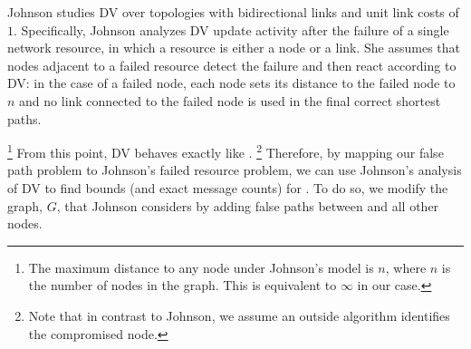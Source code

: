 {%
Johnson \cite{Johnson84} studies DV over topologies with bidirectional links and unit link costs of $1$.  Specifically, Johnson analyzes DV update 
activity after the failure of a single network resource, in which a resource is either a node or a link.  She assumes that nodes adjacent to a failed resource detect 
the failure and then react according to DV: in the case of a failed node, each node sets its distance to the failed node to $n$ and no link connected to the 
failed node is used in the final correct shortest paths. 
{\footnote {\small {The maximum distance to any node under Johnson's model is $n$, where $n$ is the number of nodes in the graph. This is equivalent to $\infty$ in our case.}}
From this point, DV behaves exactly like \seconds.
{\footnote {\small Note that in contrast to Johnson, we assume an outside algorithm identifies the compromised node.}}
Therefore, by mapping our false path problem to Johnson's failed resource problem, we can use Johnson's analysis of DV to find bounds (and exact message counts) for \seconds.
To do so, we modify the graph, $G$, that Johnson considers by adding false paths between \bad and all other nodes.



}}
